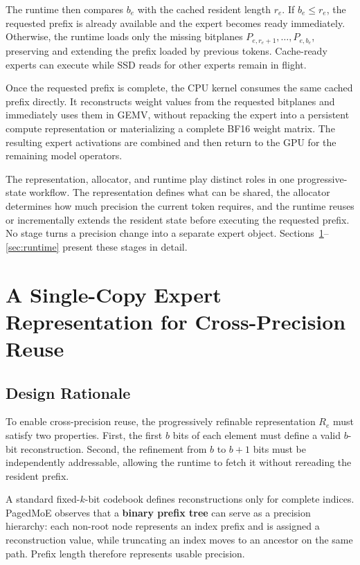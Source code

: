\documentclass[sigconf, nonacm]{acmart}
\begin{document}
The runtime then compares \(b_e\) with the cached resident length
\(r_e\). If \(b_e\leq r_e\), the requested prefix is already available
and the expert becomes ready immediately. Otherwise, the runtime
loads only the missing bitplanes
\(P_{e,r_e+1},\ldots,P_{e,b_e}\), preserving and extending the prefix
loaded by previous tokens. Cache-ready experts can execute while SSD
reads for other experts remain in flight.

Once the requested prefix is complete, the CPU kernel consumes
the same cached prefix directly. It reconstructs weight values from
the requested bitplanes and immediately uses them in GEMV, without
repacking the expert into a persistent compute representation or
materializing a complete BF16 weight matrix. The resulting expert
activations are combined and then return to the GPU for the remaining model operators.

The representation, allocator, and runtime play distinct roles in one
progressive-state workflow. The representation defines
what can be shared, the allocator determines how much precision the
current token requires, and the runtime reuses or incrementally
extends the resident state before executing the requested prefix. No
stage turns a precision change into a separate expert object.
Sections~\ref{sec:progressive-representation}--
\ref{sec:runtime} present these stages in detail.


\section{A Single-Copy Expert Representation for Cross-Precision Reuse}
\label{sec:progressive-representation}

\subsection{Design Rationale}

To enable cross-precision reuse, the progressively refinable representation
\(R_e\) must satisfy two properties. First, the first \(b\) bits of each
element must define a valid \(b\)-bit reconstruction.
Second, the refinement from \(b\) to \(b+1\) bits must be independently
addressable, allowing the runtime to fetch it without rereading the resident
prefix.

A standard fixed-\(k\)-bit codebook defines reconstructions only for complete
indices. PagedMoE observes that a \textbf{binary prefix tree} can serve as a
precision hierarchy: each non-root node represents an index prefix and is
assigned a reconstruction value, while truncating an index moves to an
ancestor on the same path. Prefix length therefore represents usable
precision.
\end{document}
